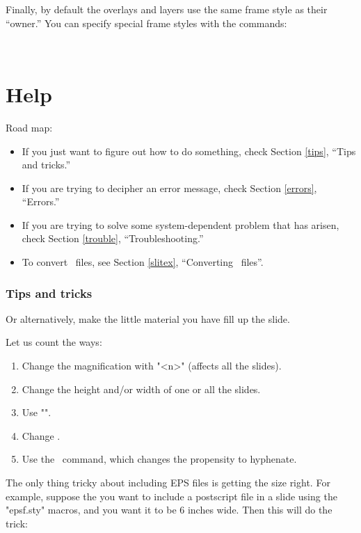 Finally, by default the overlays and layers use the same frame style as their
``owner.'' You can specify special frame styles with the commands:
\begin{MD}
  \\
\end{MD}


\part{Help\label{Help}}

Road map:
\begin{itemize}
  \item If you just want to figure out how to do something, check Section
\ref{tips}, ``Tips and tricks.''
  \item If you are trying to decipher an error message, check Section
\ref{errors}, ``Errors.''
  \item If you are trying to solve some system-dependent problem that has
arisen, check Section \ref{trouble}, ``Troubleshooting.''
  \item To convert \SliTeX\ files, see Section \ref{slitex}, ``Converting
\SliTeX\ files''.
\end{itemize}

\section{Tips and tricks\label{tips}}


Or alternatively, make the little material you have fill up the slide.

Let us count the ways:
\begin{enumerate}
\item Change the magnification with \n\slidesmag"{<n>}" (affects all the
slides).
\item Change the height and/or width of one or all the slides.
\item Use "".
\item Change \n\slidestretch.
\item Use the \n\raggedslides\ command, which changes the propensity to
hyphenate.
\end{enumerate}


The only thing tricky about including EPS files is getting the size right. For
example, suppose the you want to include a postscript file in a slide using
the "epsf.sty" macros, and you want it to be 6 inches wide. Then this will do
the trick:
\begin{LVerbatim}
  \setslidelength{\epsfxsize}{6in}
\end{LVerbatim}

